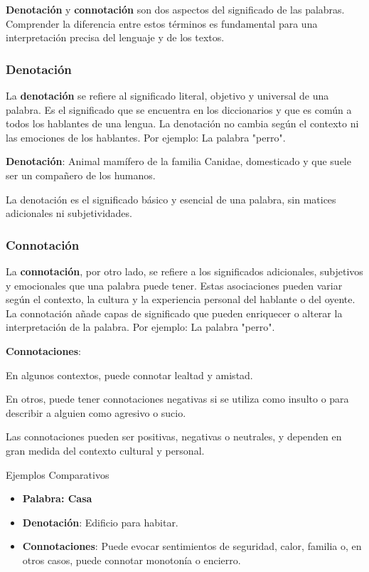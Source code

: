 \textbf{Denotación} y \textbf{connotación} son dos aspectos del significado de las palabras. Comprender la diferencia entre estos términos es fundamental para una interpretación precisa del lenguaje y de los textos.

\subsubsection{Denotación}
La \textbf{denotación} se refiere al significado literal, objetivo y universal de una palabra. Es el significado que se encuentra en los diccionarios y que es común a todos los hablantes de una lengua. La denotación no cambia según el contexto ni las emociones de los hablantes. Por ejemplo: La palabra "perro".

\textbf{Denotación}: Animal mamífero de la familia Canidae, domesticado y que suele ser un compañero de los humanos.

La denotación es el significado básico y esencial de una palabra, sin matices adicionales ni subjetividades.

\subsubsection{Connotación}

La \textbf{connotación}, por otro lado, se refiere a los significados adicionales, subjetivos y emocionales que una palabra puede tener. Estas asociaciones pueden variar según el contexto, la cultura y la experiencia personal del hablante o del oyente. La connotación añade capas de significado que pueden enriquecer o alterar la interpretación de la palabra. Por ejemplo: La palabra "perro".

\textbf{Connotaciones}:

En algunos contextos, puede connotar lealtad y amistad.

En otros, puede tener connotaciones negativas si se utiliza como insulto o para describir a alguien como agresivo o sucio.

Las connotaciones pueden ser positivas, negativas o neutrales, y dependen en gran medida del contexto cultural y personal.

Ejemplos Comparativos

\begin{itemize}
      \item \textbf{Palabra: Casa}
      \item \textbf{Denotación}: Edificio para habitar.
      \item \textbf{Connotaciones}: Puede evocar sentimientos de seguridad, calor, familia o, en otros casos, puede connotar monotonía o encierro.
\end{itemize}

